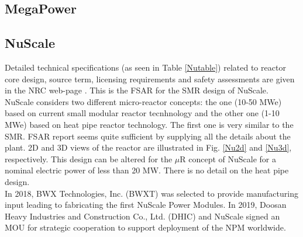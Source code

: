 \documentclass[10pt,a4paper]{article}
\begin{document}
\subsection{MegaPower}

\subsection{NuScale}
Detailed technical specifications (as seen in Table \ref{Nutable}) related to reactor core design, source term, licensing requirements and safety assessments are given in the NRC web-page \cite{NuScale18}. This is the FSAR for the SMR design of NuScale. NuScale considers two different micro-reactor concepts: the one (10-50 MWe) based on current small modular reactor tecnhnology and the other one (1-10 MWe) based on heat pipe reactor technology. The first one is very similar to the SMR. FSAR report  seems quite sufficient by supplying all the details about the plant. 2D and 3D views of the reactor are illustrated in Fig. \ref{Nu2d} and \ref{Nu3d}, respectively. This design can be altered for the $\mu$R concept of NuScale for a nominal electric power of less than 20 MW. There is no detail on the heat pipe design.  \\
In 2018, BWX Technologies, Inc. (BWXT) was selected to provide manufacturing input leading to fabricating the first NuScale Power Modules. In 2019, Doosan Heavy Industries and Construction Co., Ltd. (DHIC) and NuScale signed an MOU for strategic cooperation to support deployment of the NPM worldwide. 
\end{document}
